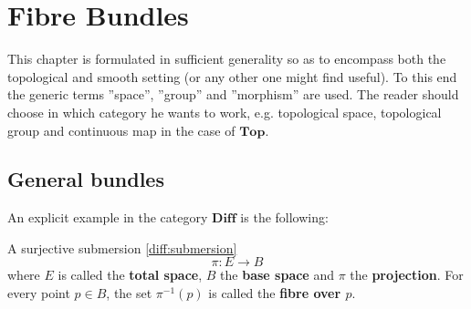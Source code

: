 \chapter{Fibre Bundles}\label{chapter:bundles}

    This chapter is formulated in sufficient generality so as to encompass both the topological and smooth setting (or any other one might find useful). To this end the generic terms ''space'', ''group'' and ''morphism'' are used. The reader should choose in which category he wants to work, e.g. topological space, topological group and continuous map in the case of $\mathbf{Top}$.

\section{General bundles}


    An explicit example in the category $\mathbf{Diff}$ is the following:
    \begin{example}
        A surjective submersion \ref{diff:submersion} \[\pi:E\rightarrow B\] where $E$ is called the \textbf{total space}, $B$ the \textbf{base space} and $\pi$ the \textbf{projection}. For every point $p\in B$, the set $\pi^{-1}(p)$ is called the \textbf{fibre over $p$}.
    \end{example}


